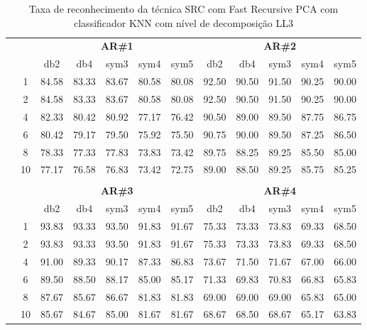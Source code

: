 \begin{table}[htpb]
	\centering
    \normalsize
	\caption{Taxa de reconhecimento da técnica SRC com Fast Recursive PCA com classificador KNN com nível de decomposição LL3}
	\begin{tabular}{|c|c|c c c c c|c c c c c|}
\cline{3-12}
\multicolumn{2}{c|}{\multirow{2}{*}{}} & \multicolumn{5}{c|}{\textbf{AR\#1}}  & \multicolumn{5}{c|}{\textbf{AR\#2}} \\\cline{3-12}

\multicolumn{2}{c|}{}  & db2 & db4 & sym3 & sym4 & sym5 & db2 & db4& sym3 & sym4 & sym5 \\\hline

\multicolumn{1}{|c|}{ \multirow{5}{*}{\rotatebox[origin=c]{90}{\textbf{K-vizinhos}}} }
&1	&84.58&	83.33&	83.67	&80.58&	80.08&	92.50&	90.50&	91.50&	90.25&	90.00	\\\cline{2-12}
&2	&84.58&	83.33&	83.67	&80.58&	80.08&	92.50&	90.50&	91.50&	90.25&	90.00	\\\cline{2-12}
&4	&82.33&	80.42&	80.92	&77.17&	76.42&	90.50&	89.00&	89.50&	87.75&	86.75	\\\cline{2-12}
&6	&80.42&	79.17&	79.50	&75.92&	75.50&	90.75&	90.00&	89.50&	87.25&	86.50	\\\cline{2-12}
&8	&78.33&	77.33&	77.83	&73.83&	73.42&	89.75&	88.25&	89.25&	85.50&	85.00	\\\cline{2-12}
&10	&77.17&	76.58&	76.83	&73.42&	72.75&	89.00&	88.50&	89.25&	85.75&	85.25	\\ \midrule
\multicolumn{12}{c}{}\\ 

\cline{3-12}
\multicolumn{2}{c}{} & \multicolumn{5}{|c|}{\textbf{AR\#3}}  & \multicolumn{5}{c|}{\textbf{AR\#4}} \\\cline{3-12}
\multicolumn{2}{c}{}  & \multicolumn{1}{|c}{db2} & db4 & sym3 & sym4 & sym5 & db2 & db4& sym3 & sym4 & sym5 \\\hline
\multicolumn{1}{|c|}{ \multirow{6}{*}{\rotatebox[origin=c]{90}{\textbf{K-vizinhos}}} }
&1	&93.83&	93.33&	93.50&	91.83&	91.67&	75.33&	73.33&	73.83&	69.33&	68.50	\\\cline{2-12}
&2	&93.83&	93.33&	93.50&	91.83&	91.67&	75.33&	73.33&	73.83&	69.33&	68.50	\\\cline{2-12}
&4	&91.00&	89.33&	90.17&	87.33&	86.83&	73.67&	71.50&	71.67&	67.00&	66.00	\\\cline{2-12}
&6	&89.50&	88.50&	88.17&	85.00&	85.17&	71.33&	69.83&	70.83&	66.83&	65.83	\\\cline{2-12}
&8	&87.67&	85.67&	86.67&	81.83&	81.83&	69.00&	69.00&	69.00&	65.83&	65.00	\\\cline{2-12}
&10	&85.67&	84.67&	85.00&	81.67&	81.67&	68.67&	68.50&	68.67&	65.17&	63.83	

\\\midrule
\end{tabular}

\end{table}



